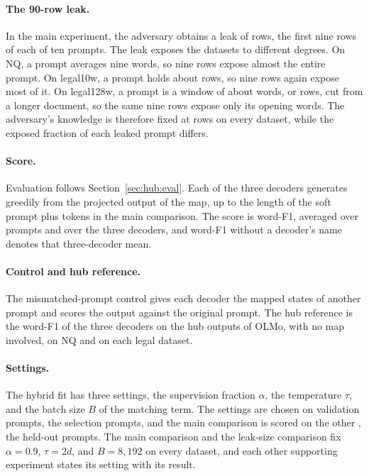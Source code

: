 \paragraph{The 90-row leak.} In the main experiment, the adversary obtains a leak of  rows, the first nine rows of each of ten prompts.
The leak exposes the datasets to different degrees.
On NQ, a prompt averages nine words, so nine rows expose almost the entire prompt.
On legal10w, a prompt holds about  rows, so nine rows again expose most of it. %
On legal128w, a prompt is a window of about  words, or  rows, cut from a longer document, so the same nine rows expose only its opening words. %
The adversary's knowledge is therefore fixed at  rows on every dataset, while the exposed fraction of each leaked prompt differs.

\paragraph{Score.} Evaluation follows Section~\ref{sec:hub:eval}.
Each of the three decoders generates greedily from the projected output of the map, up to the length of the soft prompt plus  tokens in the main comparison.
The score is word-F1, averaged over prompts and over the three decoders, and word-F1 without a decoder's name denotes that three-decoder mean. 

\paragraph{Control and hub reference.} The mismatched-prompt control gives each decoder the mapped states of another prompt and scores the output against the original prompt.
The hub reference is the word-F1 of the three decoders on the hub outputs of OLMo, with no map involved,  on NQ and  on each legal dataset. %

\paragraph{Settings.} The hybrid fit has three settings, the supervision fraction $\alpha$, the temperature $\tau$, and the batch size $B$ of the matching term.
The settings are chosen on  validation prompts, the selection prompts, and the main comparison is scored on the other , the held-out prompts. %
The main comparison and the leak-size comparison fix $\alpha = 0.9$, $\tau = 2d$, and $B = 8{,}192$ on every dataset, and each other supporting experiment states its setting with its result.

